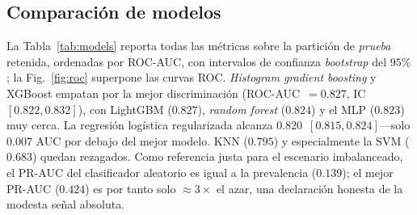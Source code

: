 \documentclass[conference]{IEEEtran}
\begin{document}
\subsection{Comparación de modelos}
La Tabla~\ref{tab:models} reporta todas las métricas sobre la partición de \emph{prueba}
retenida, ordenadas por ROC-AUC, con intervalos de confianza \emph{bootstrap} del $95\%$;
la Fig.~\ref{fig:roc} superpone las curvas ROC. \emph{Histogram gradient boosting} y
XGBoost empatan por la mejor discriminación (ROC-AUC~$=0.827$, IC~$[0.822,0.832]$), con
LightGBM ($0.827$), \emph{random forest} ($0.824$) y el MLP ($0.823$) muy cerca. La
regresión logística regularizada alcanza $0.820$~$[0.815,0.824]$---solo $0.007$ AUC por
debajo del mejor modelo. KNN ($0.795$) y especialmente la SVM ($0.683$) quedan rezagados.
Como referencia justa para el escenario imbalanceado, el PR-AUC del clasificador aleatorio
es igual a la prevalencia ($0.139$); el mejor PR-AUC ($0.424$) es por tanto solo
$\approx3\times$ el azar, una declaración honesta de la modesta señal absoluta.
\end{document}
